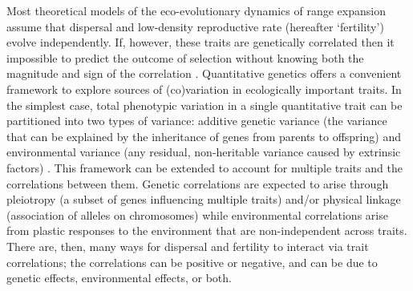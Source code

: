 Most theoretical models of the eco-evolutionary dynamics of range expansion assume that dispersal and low-density reproductive rate (hereafter `fertility') evolve independently. If, however, these traits are genetically correlated then it impossible to predict the outcome of selection without knowing both the magnitude and sign of the correlation \citep{lande_measurement_1983,chenoweth2010contribution}. Quantitative genetics offers a convenient framework to explore sources of (co)variation in ecologically important traits. In the simplest case, total phenotypic variation in a single quantitative trait can be partitioned into two types of variance: additive genetic variance (the variance that can be explained by the inheritance of genes from parents to offspring) and environmental variance (any residual, non-heritable variance caused by extrinsic factors) \citep{lynch_genetics_1998,kruuk_estimating_2004,wilson_ecologists_2010}. This framework can be extended to account for multiple traits and the correlations between them. Genetic correlations are expected to arise through pleiotropy (a subset of genes influencing multiple traits) and/or physical linkage (association of alleles on chromosomes) \citep{roff_evolutionary_1997} while environmental correlations arise from plastic responses to the environment that are non-independent across traits. There are, then, many ways for dispersal and fertility to interact via trait correlations; the correlations can be positive or negative, and can be due to genetic effects, environmental effects, or both.

